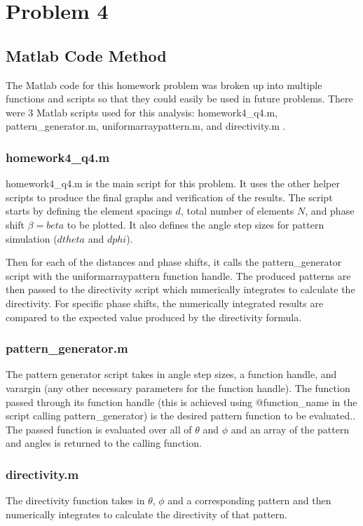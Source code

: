 \section{Problem 4}

\subsection{Matlab Code Method}
The Matlab code for this homework problem was broken up into multiple functions and scripts so that they could easily be used in future problems.
There were 3 Matlab scripts used for this analysis: homework4\_q4.m, pattern\_generator.m, uniformarraypattern.m, and directivity.m .
\subsubsection{homework4\_q4.m}
homework4\_q4.m is the main script for this problem. 
It uses the other helper scripts to produce the final graphs and verification of the results. 
The script starts by defining the element spacings $d$, total number of elements $N$, and phase shift $\beta = beta$ to be plotted. It also defines the angle step sizes for pattern simulation ($dtheta$ and $dphi$). 

Then for each of the distances and phase shifts, it calls the pattern\_generator script with the uniformarraypattern function handle. 
The produced patterns are then passed to the directivity script which numerically integrates to calculate the directivity.
For specific phase shifts, the numerically integrated results are compared to the expected value produced by the directivity formula.
\subsubsection{pattern\_generator.m}
The pattern generator script takes in angle step sizes, a function handle, and varargin (any other necessary parameters for the function handle). The function passed through its function handle (this is achieved using @function\_name in the script calling pattern\_generator) is the desired pattern function to be evaluated..
The passed function is evaluated over all of $\theta$ and $\phi$ and an array of the pattern and angles is returned to the calling function.  
\subsubsection{directivity.m}
The directivity function takes in $\theta$, $\phi$ and a corresponding pattern and then numerically integrates to calculate the directivity of that pattern.
